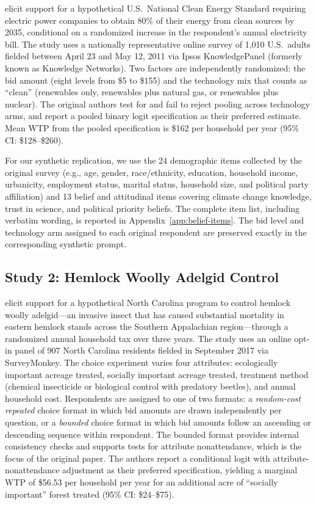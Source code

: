 \documentclass[12pt]{article}
\begin{document}
\textcite{Aldy2012} elicit support for a hypothetical U.S.\ National Clean
Energy Standard requiring electric power companies to obtain 80\% of their
energy from clean sources by 2035, conditional on a randomized increase in
the respondent's annual electricity bill. The study uses a nationally
representative online survey of 1{,}010 U.S.\ adults fielded between
April 23 and May 12, 2011 via Ipsos KnowledgePanel (formerly known as Knowledge Networks). Two
factors are independently randomized: the bid amount (eight levels from
\$5 to \$155) and the technology mix that counts as ``clean'' (renewables
only, renewables plus natural gas, or renewables plus nuclear). The
original authors test for and fail to reject pooling across technology
arms, and report a pooled binary logit specification as their preferred
estimate. Mean WTP from the pooled specification is \$162 per household
per year (95\% CI: \$128--\$260).

For our synthetic replication, we use the 24 demographic items
collected by the original survey (e.g., age, gender, race/ethnicity, education,
household income, urbanicity, employment status, marital status, household size,
and political party affiliation) and 13 belief and attitudinal items
covering climate
change knowledge, trust in science, and political priority beliefs. The complete item list, including verbatim wording, is
reported in Appendix~\ref{app:belief-items}. The bid level and technology
arm assigned to each original respondent are preserved exactly in the
corresponding synthetic prompt.

\subsection{Study 2: Hemlock Woolly Adelgid Control}\label{sec:data-hwa}

\textcite{Giguere2020} elicit support for a hypothetical North Carolina
program to control hemlock woolly adelgid---an invasive insect that has
caused substantial mortality in eastern hemlock stands across the Southern
Appalachian region---through a randomized annual household tax over three
years. The study uses an online opt-in panel of 907 North Carolina
residents fielded in September 2017 via SurveyMonkey.
The choice experiment varies four attributes: ecologically important
acreage treated, socially important acreage treated, treatment method
(chemical insecticide or biological control with predatory beetles), and
annual household cost. Respondents are assigned to one of two formats: a
\textit{random-cost repeated} choice format in which bid amounts are drawn
independently per question, or a \textit{bounded} choice format in which
bid amounts follow an ascending or descending sequence within respondent.
The bounded format provides internal consistency checks and supports tests
for attribute nonattendance, which is the focus of the original paper.
The authors report a conditional logit with attribute-nonattendance
adjustment as their preferred specification, yielding a marginal WTP of
\$56.53 per household per year for an additional acre of ``socially
important'' forest treated (95\% CI: \$24--\$75).
\end{document}
